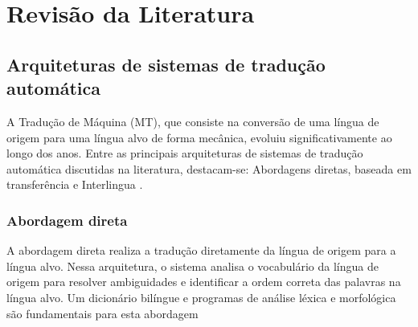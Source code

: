 \chapter{Revisão da Literatura}




\section{Arquiteturas de sistemas de tradução automática}

A Tradução de Máquina (MT), que consiste na conversão de uma língua de origem para uma língua alvo de forma mecânica, evoluiu significativamente ao longo dos anos. Entre as principais arquiteturas de sistemas de tradução automática discutidas na literatura, destacam-se: Abordagens diretas, baseada em transferência e Interlingua \cite{cheragui}.


\subsection{\textbf{Abordagem direta}}
A abordagem direta realiza a tradução diretamente da língua de origem para a língua alvo. Nessa arquitetura, o sistema analisa o vocabulário da língua de origem para resolver ambiguidades e identificar a ordem correta das palavras na língua alvo. Um dicionário bilíngue e programas de análise léxica e morfológica são fundamentais para esta abordagem \cite[p. 163]{cheragui}

